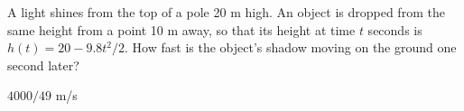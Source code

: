 \begin{exercises}
\begin{exercise}
A light shines from the top of a pole 20 m high.  An object is dropped from
the same height from a point 10 m away, so that its height at time $t$
seconds is $h(t)=20-9.8t^2/2$.  How fast is the object's shadow
moving on the ground one second later?
\begin{answer} $4000/49$ m/s
\end{answer}\end{exercise}






\end{exercises}
